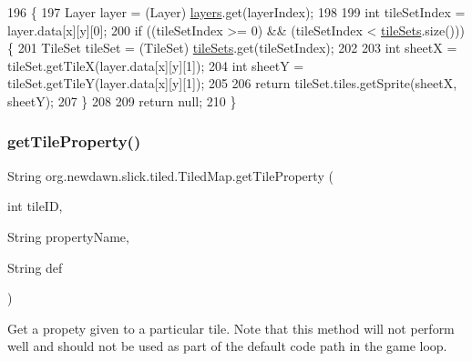 \begin{DoxyCode}
196                                                             \{
197         Layer layer = (Layer) \mbox{\hyperlink{classorg_1_1newdawn_1_1slick_1_1tiled_1_1_tiled_map_a33061324d017a4cd8f41d04e0c60ac27}{layers}}.get(layerIndex);
198 
199         \textcolor{keywordtype}{int} tileSetIndex = layer.data[x][y][0];
200         \textcolor{keywordflow}{if} ((tileSetIndex >= 0) && (tileSetIndex < \mbox{\hyperlink{classorg_1_1newdawn_1_1slick_1_1tiled_1_1_tiled_map_a4fd72e23a7aaf6f85905f4bf78e2ce5f}{tileSets}}.size())) \{
201             TileSet tileSet = (TileSet) \mbox{\hyperlink{classorg_1_1newdawn_1_1slick_1_1tiled_1_1_tiled_map_a4fd72e23a7aaf6f85905f4bf78e2ce5f}{tileSets}}.get(tileSetIndex);
202 
203             \textcolor{keywordtype}{int} sheetX = tileSet.getTileX(layer.data[x][y][1]);
204             \textcolor{keywordtype}{int} sheetY = tileSet.getTileY(layer.data[x][y][1]);
205 
206             \textcolor{keywordflow}{return} tileSet.tiles.getSprite(sheetX, sheetY);
207         \}
208 
209         \textcolor{keywordflow}{return} null;
210     \}
\end{DoxyCode}
\mbox{\label{classorg_1_1newdawn_1_1slick_1_1tiled_1_1_tiled_map_aea96107a7e2b3c843771ae8c0f691368}} 
\subsubsection{\texorpdfstring{get\+Tile\+Property()}{getTileProperty()}}
{\footnotesize\ttfamily String org.\+newdawn.\+slick.\+tiled.\+Tiled\+Map.\+get\+Tile\+Property (\begin{DoxyParamCaption}\item[{int}]{tile\+ID,  }\item[{String}]{property\+Name,  }\item[{String}]{def }\end{DoxyParamCaption})\hspace{0.3cm}{\ttfamily [inline]}}

Get a propety given to a particular tile. Note that this method will not perform well and should not be used as part of the default code path in the game loop.


